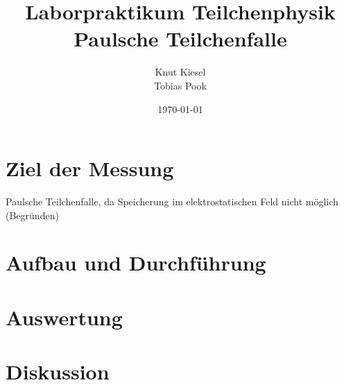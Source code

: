 \documentclass[a4paper,12pt]{article}
\title{Laborpraktikum Teilchenphysik\\ Paulsche Teilchenfalle}
\author{Knut Kiesel\\Tobias Pook}
\date{\today}
\begin{document}
\maketitle
\thispagestyle{empty}
\newpage
\tableofcontents
\setcounter{page}{1}
\newpage

\section{Ziel der Messung} %
Paulsche Teilchenfalle, da Speicherung im elektrostatischen Feld nicht möglich (Begründen)


\section{Aufbau und Durchführung}


\section{Auswertung}
\section{Diskussion}

\begin{figure}[htb]
		\centering
		\label{fig:lhc}
\end{figure}
\FloatBarrier







\end{document}
